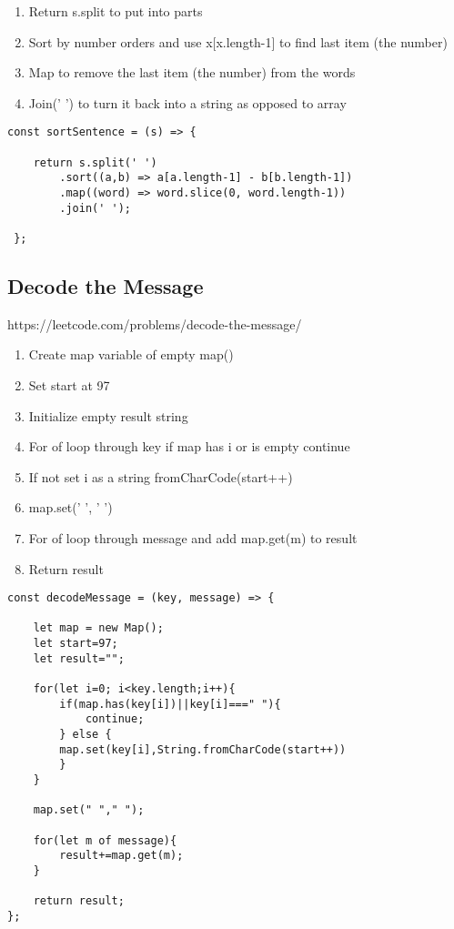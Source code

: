 \documentclass[10pt]{article}
\begin{document}
\begin{enumerate}
	\item Return s.split to put into parts
	\item Sort by number orders and use x[x.length-1] to find last item (the number)
	\item Map to remove the last item (the number) from the words
	\item Join(' ') to turn it back into a string as opposed to array
\end{enumerate}

\begin{lstlisting}[title=Solution sortSentence, captionpos=t]
const sortSentence = (s) => {

    return s.split(' ')
        .sort((a,b) => a[a.length-1] - b[b.length-1])
        .map((word) => word.slice(0, word.length-1))
        .join(' ');
        
 };
\end{lstlisting}
\medskip %


\pagebreak %
\medskip 
\subsection{Decode the Message}
https://leetcode.com/problems/decode-the-message/

\begin{enumerate}
	\item Create map variable of empty map()
	\item Set start at 97
	\item Initialize empty result string
	\item For of loop through key if map has i or is empty continue 
	\item If not set i as a string fromCharCode(start++)
	\item map.set(' ', ' ')
	\item For of loop through message and add map.get(m) to result
	\item Return result
\end{enumerate}

\begin{lstlisting}[title=Solution decodeMessage, captionpos=t]
const decodeMessage = (key, message) => {
    
    let map = new Map();
    let start=97;
    let result="";

    for(let i=0; i<key.length;i++){
        if(map.has(key[i])||key[i]===" "){
            continue;
        } else {
        map.set(key[i],String.fromCharCode(start++)) 
        }
    }
    
    map.set(" "," "); 
    
    for(let m of message){
        result+=map.get(m);
    }
    
    return result;
};
\end{lstlisting}
\medskip %
\end{document}
